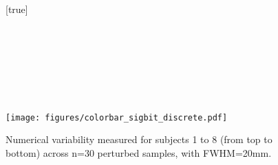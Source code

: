 \documentclass[lettersize,journal]{IEEEtran}
\newcommand{\fmriprep}{\emph{fMRIPrep}\xspace}
\begin{document}
\begin{landscape}
    \begin{figure}
        \vspace*{-2cm}
        \centering
        [true] \\
         \\
         \\
         \\
         \\
         \\
         \\
         \\
        \texttt{[image: figures/colorbar\_sigbit\_discrete.pdf]}
        \caption{Numerical variability measured for subjects 1 to 8 (from top to bottom) across n=30 perturbed samples, with FWHM=20mm. }
        \label{fig:uncertainty-maps-20mm-disc}
    \end{figure}
\end{landscape}





\end{document}
